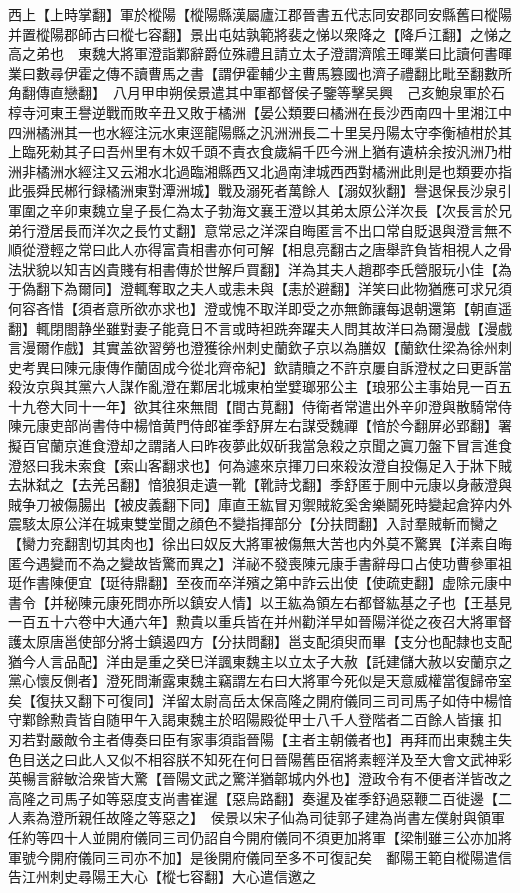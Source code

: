 西上【上時掌翻】軍於樅陽【樅陽縣漢屬廬江郡晉書五代志同安郡同安縣舊曰樅陽并置樅陽郡師古曰樅七容翻】景出屯姑孰範將裴之悌以衆降之【降戶江翻】之悌之高之弟也　東魏大將軍澄詣鄴辭爵位殊禮且請立太子澄謂濟隂王暉業曰比讀何書暉業曰數尋伊霍之傳不讀曹馬之書【謂伊霍輔少主曹馬篡國也濟子禮翻比毗至翻數所角翻傳直戀翻】　八月甲申朔侯景遣其中軍都督侯子鑒等擊吴興　己亥鮑泉軍於石椁寺河東王譽逆戰而敗辛丑又敗于橘洲【晏公類要曰橘洲在長沙西南四十里湘江中四洲橘洲其一也水經注沅水東逕龍陽縣之汎洲洲長二十里吴丹陽太守李衡植柑於其上臨死勑其子曰吾州里有木奴千頭不責衣食歲絹千匹今洲上猶有遺枿余按汎洲乃柑洲非橘洲水經注又云湘水北過臨湘縣西又北過南津城西西對橘洲此則是也類要亦指此張舜民郴行録橘洲東對潭洲城】戰及溺死者萬餘人【溺奴狄翻】譽退保長沙泉引軍圍之辛卯東魏立皇子長仁為太子勃海文襄王澄以其弟太原公洋次長【次長言於兄弟行澄居長而洋次之長竹丈翻】意常忌之洋深自晦匿言不出口常自貶退與澄言無不順從澄輕之常曰此人亦得富貴相書亦何可解【相息亮翻古之唐舉許負皆相視人之骨法狀貌以知吉凶貴賤有相書傳於世解戶買翻】洋為其夫人趙郡李氏營服玩小佳【為于偽翻下為爾同】澄輒奪取之夫人或恚未與【恚於避翻】洋笑曰此物猶應可求兄須何容吝惜【須者意所欲亦求也】澄或愧不取洋即受之亦無飾讓每退朝還第【朝直遥翻】輒閉閤静坐雖對妻子能竟日不言或時袒跣奔躍夫人問其故洋曰為爾漫戲【漫戲言漫爾作戲】其實盖欲習勞也澄獲徐州刺史蘭欽子京以為膳奴【蘭欽仕梁為徐州刺史考異曰陳元康傳作蘭固成今從北齊帝紀】欽請贖之不許京屢自訴澄杖之曰更訴當殺汝京與其黨六人謀作亂澄在鄴居北城東柏堂嬖瑯邪公主【琅邪公主事始見一百五十九卷大同十一年】欲其往來無間【間古莧翻】侍衛者常遣出外辛卯澄與散騎常侍陳元康吏部尚書侍中楊愔黄門侍郎崔季舒屏左右謀受魏禪【愔於今翻屏必郢翻】署擬百官蘭京進食澄却之謂諸人曰昨夜夢此奴斫我當急殺之京聞之寘刀盤下冒言進食澄怒曰我未索食【索山客翻求也】何為遽來京揮刀曰來殺汝澄自投傷足入于牀下賊去牀弑之【去羌呂翻】愔狼狽走遺一靴【靴詩戈翻】季舒匿于厠中元康以身蔽澄與賊争刀被傷腸出【被皮義翻下同】庫直王紘冒刃禦賊紇奚舍樂鬬死時變起倉猝内外震駭太原公洋在城東雙堂聞之顔色不變指揮部分【分扶問翻】入討羣賊斬而臠之【臠力兖翻割切其肉也】徐出曰奴反大將軍被傷無大苦也内外莫不驚異【洋素自晦匿今遇變而不為之變故皆驚而異之】洋祕不發喪陳元康手書辭母口占使功曹參軍祖珽作書陳便宜【珽待鼎翻】至夜而卒洋殯之第中詐云出使【使疏吏翻】虚除元康中書令【并秘陳元康死問亦所以鎮安人情】以王紘為領左右都督紘基之子也【王基見一百五十六卷中大通六年】勲貴以重兵皆在并州勸洋早如晉陽洋從之夜召大將軍督護太原唐邕使部分將士鎮遏四方【分扶問翻】邕支配須臾而畢【支分也配隸也支配猶今人言品配】洋由是重之癸巳洋諷東魏主以立太子大赦【託建儲大赦以安蘭京之黨心懷反側者】澄死問漸露東魏主竊謂左右曰大將軍今死似是天意威權當復歸帝室矣【復扶又翻下可復同】洋留太尉高岳太保高隆之開府儀同三司司馬子如侍中楊愔守鄴餘勲貴皆自随甲午入謁東魏主於昭陽殿從甲士八千人登階者二百餘人皆攘扣刃若對嚴敵令主者傳奏曰臣有家事須詣晉陽【主者主朝儀者也】再拜而出東魏主失色目送之曰此人又似不相容朕不知死在何日晉陽舊臣宿將素輕洋及至大會文武神彩英暢言辭敏洽衆皆大驚【晉陽文武之驚洋猶郼城内外也】澄政令有不便者洋皆改之高隆之司馬子如等惡度支尚書崔暹【惡烏路翻】奏暹及崔季舒過惡鞭二百徙邊【二人素為澄所親任故隆之等惡之】　侯景以宋子仙為司徒郭子建為尚書左僕射與領軍任約等四十人並開府儀同三司仍詔自今開府儀同不須更加將軍【梁制雖三公亦加將軍號今開府儀同三司亦不加】是後開府儀同至多不可復記矣　鄱陽王範自樅陽遣信告江州刺史尋陽王大心【樅七容翻】大心遣信邀之